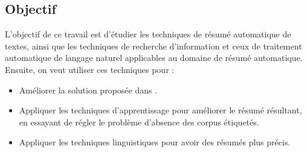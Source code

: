 \documentclass[12pt, a4paper]{article}
\begin{document}
\subsection{Objectif}

L'objectif de ce travail est d'étudier les techniques de résumé automatique de textes, ainsi que les techniques de recherche d'information et ceux de traitement automatique de langage naturel applicables au domaine de résumé automatique. 
Ensuite, on veut utiliser ces techniques pour :
\begin{itemize}
	\item Améliorer la solution proposée dans \cite{13-aries-al}.
	\item Appliquer les techniques d’apprentissage pour améliorer le résumé résultant, en essayant de régler le problème d'absence des corpus étiquetés.
	\item Appliquer les techniques linguistiques pour avoir des résumés plus précis.
\end{itemize}




\end{document}

